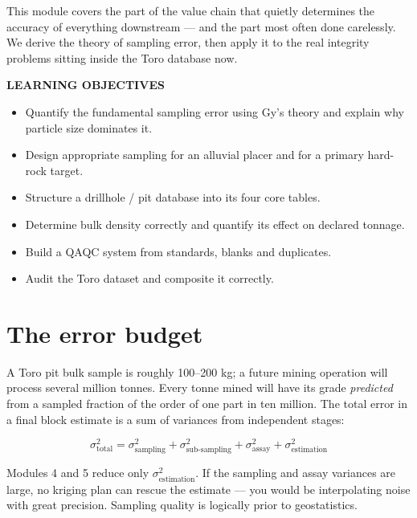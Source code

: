 \documentclass[11pt]{article}
\begin{document}

This module covers the part of the value chain that quietly determines
the accuracy of everything downstream --- and the part most often done
carelessly. We derive the theory of sampling error, then apply it to the
real integrity problems sitting inside the Toro database now.

\begin{objbox}
{\sffamily\bfseries\color{bronze}LEARNING OBJECTIVES}
\begin{itemize}[leftmargin=14pt,itemsep=2pt]
\item Quantify the fundamental sampling error using Gy's theory and
explain why particle size dominates it.
\item Design appropriate sampling for an alluvial placer and for a
primary hard-rock target.
\item Structure a drillhole / pit database into its four core tables.
\item Determine bulk density correctly and quantify its effect on
declared tonnage.
\item Build a QAQC system from standards, blanks and duplicates.
\item Audit the Toro dataset and composite it correctly.
\end{itemize}
\end{objbox}

\section{The error budget}

A Toro pit bulk sample is roughly 100--200 kg; a future mining operation
will process several million tonnes. Every tonne mined will have its
grade \emph{predicted} from a sampled fraction of the order of one part
in ten million. The total error in a final block estimate is a sum of
variances from independent stages:

\begin{eqbox}
\[ \sigma^2_{\text{total}} = \sigma^2_{\text{sampling}}
   + \sigma^2_{\text{sub-sampling}} + \sigma^2_{\text{assay}}
   + \sigma^2_{\text{estimation}} \tag{2.1}\]
\end{eqbox}

\begin{keybox}
Modules 4 and 5 reduce only $\sigma^2_{\text{estimation}}$. If the
sampling and assay variances are large, no kriging plan can rescue the
estimate --- you would be interpolating noise with great precision.
Sampling quality is logically prior to geostatistics.
\end{keybox}
\end{document}
